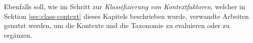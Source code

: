 Ebenfalls soll, wie im Schritt zur \textit{Klassifizierung von Kontextfaktoren}, welcher in Sektion \ref{sec:class-context} dieses Kapitels beschrieben wurde, verwandte Arbeiten genutzt werden, um die Kontexte und die Taxonomie zu evaluieren oder zu ergänzen.






